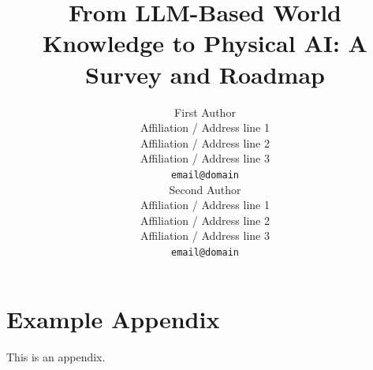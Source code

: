 \documentclass[11pt]{article}
\title{From LLM-Based World Knowledge to Physical AI: A Survey and Roadmap}
\author{First Author \\
  Affiliation / Address line 1 \\
  Affiliation / Address line 2 \\
  Affiliation / Address line 3 \\
  \texttt{email@domain} \\\And
  Second Author \\
  Affiliation / Address line 1 \\
  Affiliation / Address line 2 \\
  Affiliation / Address line 3 \\
  \texttt{email@domain} \\}
\begin{document}
\maketitle
















\appendix

\section{Example Appendix}
\label{sec:appendix}

This is an appendix.
\end{document}

